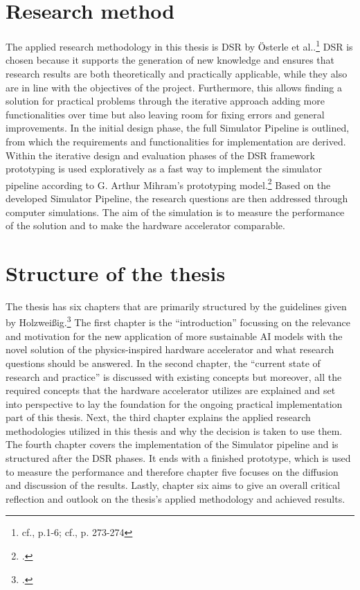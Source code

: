 \section{Research method}

The applied research methodology in this thesis is \ac{DSR} by Österle et al..\footnote{cf.\cite{oesterleMemorandumZurGestaltungsorientierten2010}, p.1-6; cf.\cite{oesterleKonsortialforschung2010}, p. 273-274}
\ac{DSR} is chosen because it supports the generation of new knowledge and ensures that research results are both theoretically and practically
applicable, while they also are in line with the objectives of the project.
Furthermore, this allows finding a solution for practical problems through the iterative approach adding more functionalities over time but also leaving room for fixing errors and general improvements.
In the initial design phase, the full Simulator Pipeline is outlined, from which the requirements and functionalities for implementation are derived.
Within the iterative design and evaluation phases of the \ac{DSR} framework prototyping is used exploratively as a fast way to implement the simulator pipeline according to G. Arthur Mihram's prototyping model.\footcite[cf.][71-72]{mihramSimulationMethodology1976}
Based on the developed Simulator Pipeline, the research questions are then addressed through computer simulations.
The aim of the simulation is to measure the performance of the solution and to make the hardware accelerator comparable. 

\section{Structure of the thesis}
The thesis has six chapters that are primarily structured by the guidelines given by Holzweißig.\footcite[cf.][32-40]{holzweissigWissenschaftlichesArbeiten2017}
The first chapter is the ``introduction'' focussing on the relevance and motivation for the new application of more sustainable AI models
with the novel solution of the physics-inspired hardware accelerator and what research questions should be answered.
In the second chapter, the ``current state of research and practice'' is discussed with 
existing concepts but moreover, all the required concepts that the hardware accelerator utilizes are explained 
and set into perspective to lay the foundation for the ongoing practical implementation part of this thesis.
Next, the third chapter explains the applied research methodologies utilized in this thesis and why the decision is taken to use them.
The fourth chapter covers the implementation of the Simulator pipeline and is structured after the \ac{DSR} phases.
It ends with a finished prototype, which is used to measure the performance and therefore chapter five focuses on the 
diffusion and discussion of the results. 
Lastly, chapter six aims to give an overall critical reflection and outlook on the thesis's applied methodology and achieved results.









